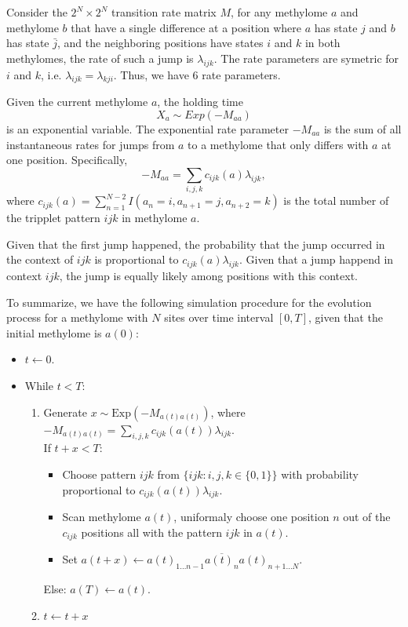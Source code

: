 \documentclass[11pt]{article}
\begin{document}
Consider the $2^N \times 2^N$ transition rate matrix $M$, for any
methylome $a$ and methylome $b$ that have a single difference at a
position where $a$ has state $j$ and $b$ has state $\bar{j}$, and the
neighboring positions have states $i$ and $k$ in both methylomes, the
rate of such a jump is $\lambda_{ijk}$.  The rate parameters are
symetric for $i$ and $k$, i.e. $\lambda_{ijk}=\lambda_{kji}$. Thus, we
have 6 rate parameters. 

Given the current methylome $a$, the holding time
\[
  X_a\sim Exp(-M_{aa})
\]
is an exponential variable. The exponential rate
parameter $-M_{aa}$ is the sum of all instantaneous rates for jumps
from $a$ to a methylome that only differs with $a$ at one
position. Specifically,
\[
  -M_{aa} =  \sum\limits_{i,j,k}c_{ijk}(a)\lambda_{ijk},
\]
where $c_{ijk}(a) = \sum_{n=1}^{N-2}I(a_{n}=i, a_{n+1}=j, a_{n+2}=k)$ is the total number
of the tripplet pattern $ijk$ in methylome $a$.

Given that the first jump happened, the probability that the jump
occurred in the context of $ijk$ is proportional to
$c_{ijk}(a)\lambda_{ijk}$. Given that a jump happend in context $ijk$,
the jump is equally likely among positions with this context.

To summarize, we have the following simulation procedure for the evolution
process for a methylome with $N$ sites over time interval $[0, T]$, given
that the initial methylome is $a(0)$:
\begin{itemize}
\item $t \leftarrow 0$.
\item While $t < T$:
  \begin{enumerate}
  \item Generate $x\sim \text{Exp}(-M_{a(t)a(t)})$, where
    $-M_{a(t)a(t)} = \sum\limits_{i,j,k}c_{ijk}(a(t))\lambda_{ijk}$. \\
    If $t+x < T$:
    \begin{itemize}
    \item Choose pattern $ijk$ from $\{ijk: i,j,k\in\{0,1\}\}$ with
      probability proportional to $c_{ijk}(a(t))\lambda_{ijk}$.
    \item Scan methylome $a(t)$, uniformaly choose one position $n$
      out of the $c_{ijk}$ positions all with the pattern $ijk$ in $a(t)$.
    \item Set $a(t+x) \leftarrow a(t)_{1\ldots n-1} \overline{a(t)_n}
      a(t)_{n+1 \ldots N}$.
    \end{itemize}
    Else: $a(T) \leftarrow a(t)$.
  \item $t \leftarrow t+x$
  \end{enumerate}
\end{itemize}



\end{document}
